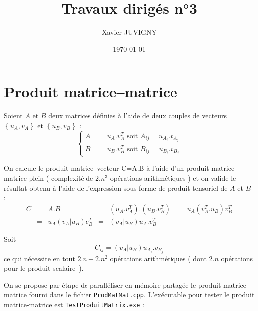 \documentclass[11pt,a4paper]{article}
\author{Xavier JUVIGNY}
\date{\today}
\title{Travaux dirigés n°3}
\begin{document}
\maketitle
\tableofcontents

\section{Produit matrice--matrice}

Soient $A$ et $B$ deux matrices définies à l'aide de deux couples de vecteurs $\left\{u_{A},v_{A}\right\}$ et 
$\left\{u_{B},v_{B}\right\}$ :
\[
\left\{
	\begin{array}{lcl}
	A & = & u_{A}.v_{A}^{T}\mbox{ soit } A_{ij} = u_{A_{i}}.v_{A_{j}} \\
	B & = & u_{B}.v_{B}^{T}\mbox{ soit } B_{ij} = u_{B_{i}}.v_{B_{j}}
    \end{array}
\right.
\]

On calcule le produit matrice--vecteur C=A.B à l'aide d'un produit matrice--matrice plein ( complexité de $2.n^{3}$ opérations arithmétiques )
et on valide le résultat obtenu à l'aide de l'expression sous forme de produit tensoriel de $A$ et $B$ :
\[
\begin{array}{lclclcl}
C & = & A.B & = & \left(u_{A}.v_{A}^{T}\right).\left(u_{B}.v_{B}^{T}\right) & = &  u_{A}\left(v_{A}^{T}.u_{B}\right)v_{B}^{T}\\
 &=& u_{A}\left(v_{A}|u_{B}\right)v_{B}^{T} & = & \left(v_{A}|u_{B}\right)u_{A}.v_{B}^{T}
 \end{array}
\]

Soit
\[
C_{ij} = \left(v_{A}|u_{B}\right)u_{A_{i}}.v_{B_{j}}
\]
ce qui nécessite en tout $2.n+2.n^{2}$ opérations arithmétiques ( dont $2.n$ opérations pour le produit scalaire~).

On se propose par étape de paralléliser en mémoire partagée le produit matrice--matrice fourni dans le fichier \texttt{ProdMatMat.cpp}. 
L'exécutable pour tester le produit matrice-matrice est \texttt{TestProduitMatrix.exe} :
\end{document}
